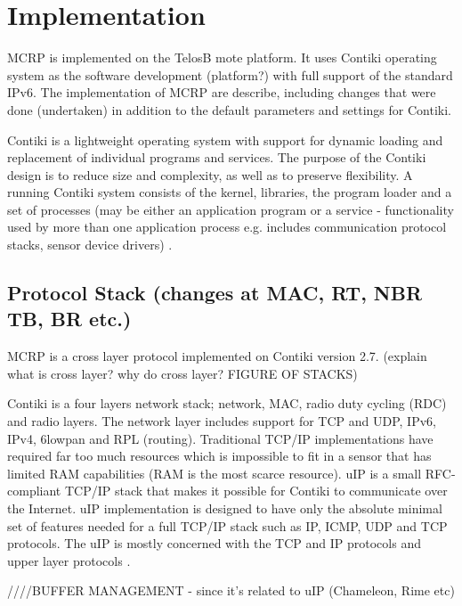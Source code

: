 \chapter{Implementation}
\label{implementation}

MCRP is implemented on the TelosB mote platform. It uses Contiki operating system as the software development (platform?) with full support of the standard IPv6. The implementation of MCRP are describe, including changes that were done (undertaken) in addition to the default parameters and settings for Contiki.

Contiki is a lightweight operating system with support for dynamic loading and replacement of individual programs and services. The purpose of the Contiki design is to reduce size and complexity, as well as to preserve flexibility. A running Contiki system consists of the kernel, libraries, the program loader and a set of processes (may be either an application program or a service - functionality used by more than one application process e.g. includes communication protocol stacks, sensor device drivers) \cite{contiki}. 
 
\section{Protocol Stack (changes at MAC, RT, NBR TB, BR etc.)}
MCRP is a cross layer protocol implemented on Contiki version 2.7. (explain what is cross layer? why do cross layer? FIGURE OF STACKS)

Contiki is a four layers network stack; network, MAC, radio duty cycling (RDC) and radio layers. The network layer includes support for TCP and UDP, IPv6, IPv4, 6lowpan and RPL (routing). Traditional TCP/IP implementations have required far too much resources which is impossible to fit in a sensor that has limited RAM capabilities (RAM is the most scarce resource). uIP \cite{uip} is a small RFC-compliant TCP/IP stack that makes it possible for Contiki to communicate over the Internet. uIP implementation is designed to have only the absolute minimal set of features needed for a full TCP/IP stack such as IP, ICMP, UDP and TCP protocols. The uIP is mostly concerned with the TCP and IP protocols and upper layer protocols \cite{contikiDoc, contikiUIP}. 

////BUFFER MANAGEMENT - since it's related to uIP (Chameleon, Rime etc)


